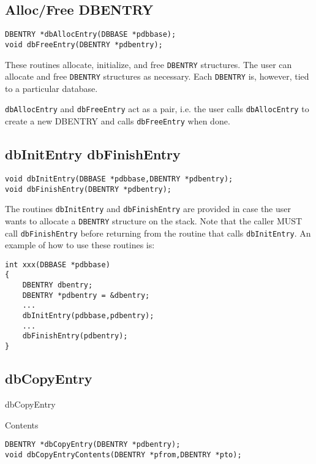 \subsection{Alloc/Free DBENTRY}

\begin{verbatim}
DBENTRY *dbAllocEntry(DBBASE *pdbbase);
void dbFreeEntry(DBENTRY *pdbentry);
\end{verbatim}

These routines allocate, initialize, and free \verb|DBENTRY| structures. The user can allocate and free \verb|DBENTRY| structures as 
necessary. Each \verb|DBENTRY| is, however, tied to a particular database.

\verb|dbAllocEntry| and \verb|dbFreeEntry| act as a pair, i.e. the user calls \verb|dbAllocEntry| to create a new DBENTRY and 
calls \verb|dbFreeEntry| when done.

\subsection{dbInitEntry dbFinishEntry}

\begin{verbatim}
void dbInitEntry(DBBASE *pdbbase,DBENTRY *pdbentry);
void dbFinishEntry(DBENTRY *pdbentry);
\end{verbatim}

The routines \verb|dbInitEntry| and \verb|dbFinishEntry| are provided in case the user wants to allocate a \verb|DBENTRY| structure 
on the stack. Note that the caller MUST call \verb|dbFinishEntry| before returning from the routine that calls 
\verb|dbInitEntry|. An example of how to use these routines is:

\begin{verbatim}
int xxx(DBBASE *pdbbase)
{
    DBENTRY dbentry;
    DBENTRY *pdbentry = &dbentry;
    ...
    dbInitEntry(pdbbase,pdbentry);
    ...
    dbFinishEntry(pdbentry);
}

\end{verbatim}

\subsection{dbCopyEntry}

dbCopyEntry

Contents

\begin{verbatim}
DBENTRY *dbCopyEntry(DBENTRY *pdbentry);
void dbCopyEntryContents(DBENTRY *pfrom,DBENTRY *pto);
\end{verbatim}

